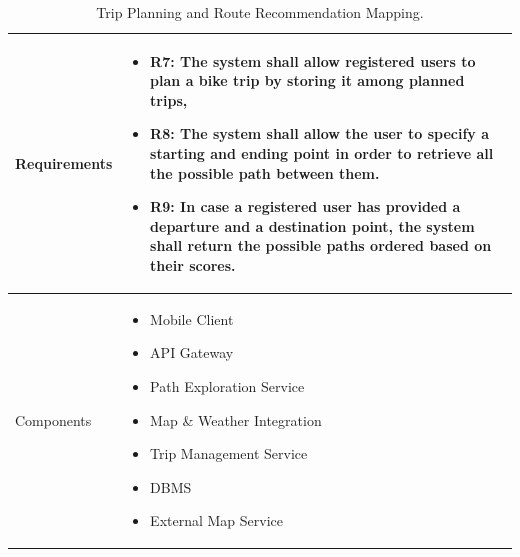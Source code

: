 \begin{table}[H]
    \centering
    \renewcommand{\arraystretch}{1.3}
    \begin{tabular}{|p{}|p{}|}
        \hline
        Requirements & \begin{itemize}[topsep=0pt, partopsep=0pt, leftmargin=*] 
            \item R7: The system shall allow registered users to plan a bike trip by storing it among planned trips,
            \item R8: The system shall allow the user to specify a starting and ending point in order to retrieve all the possible path between them.
            \item R9: In case a registered user has provided a departure and a destination point, the system shall return the possible paths ordered based on their scores.
        \end{itemize} \\
        \hline
        Components & \begin{itemize}[topsep=0pt, partopsep=0pt, leftmargin=*] 
            \item Mobile Client
            \item API Gateway
            \item Path Exploration Service
            \item Map \& Weather Integration
            \item Trip Management Service
            \item DBMS
            \item External Map Service
        \end{itemize} \\
        \hline
    \end{tabular}
    \caption{Trip Planning and Route Recommendation Mapping.}
    \label{tab:trip_planning_mapping}
\end{table}

